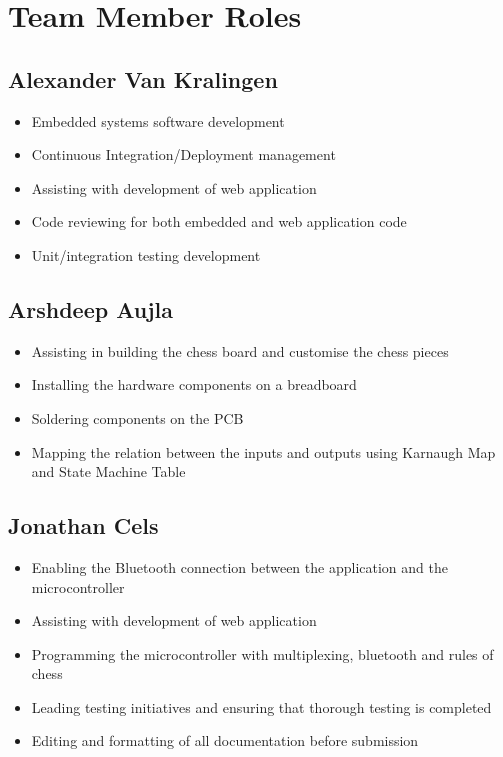 \documentclass{article}
\begin{document}
\medskip
{}

\section{Team Member Roles}
\subsection{Alexander Van Kralingen}
\begin{itemize}
    \item Embedded systems software development
    \item Continuous Integration/Deployment management
    \item Assisting with development of web application
    \item Code reviewing for both embedded and web application code
    \item Unit/integration testing development
\end{itemize}

\subsection{Arshdeep Aujla}
\begin{itemize}
    \item Assisting in building the chess board and customise the chess pieces
    \item Installing the hardware components on a breadboard
    \item Soldering components on the PCB
    \item Mapping the relation between the inputs and outputs using Karnaugh Map and State Machine Table 
\end{itemize}

\subsection{Jonathan Cels}
\begin{itemize}
    \item Enabling the Bluetooth connection between the application and the microcontroller
    \item Assisting with development of web application
    \item Programming the microcontroller with multiplexing, bluetooth and rules of chess
    \item Leading testing initiatives and ensuring that thorough testing is completed
    \item Editing and formatting of all documentation before submission
\end{itemize}
\end{document}
